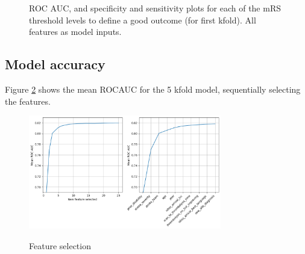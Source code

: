 \begin{figure}[!ht]
\hfil
    \label{fig:rocauc_ss_all_features}
  \caption{ROC AUC, and specificity and sensitivity plots for each of the mRS threshold levels to define a good outcome (for first kfold). All features as model inputs.}

\end{figure}






\subsection{Model accuracy}


Figure \ref{fig:feature_selection} shows the mean ROCAUC for the 5 kfold model, sequentially selecting the features.

\begin{figure}[!h]
    \centering
    \includegraphics[width=0.75\textwidth]{./images/020_feature_selection.jpg}\\
    \caption{Feature selection}
    \label{fig:feature_selection}
\end{figure}


